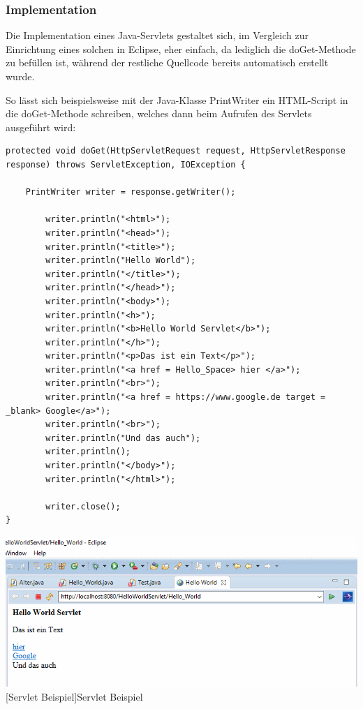 \documentclass[12pt,a4paper,bibliography=totocnumbered,listof=totocnumbered]{scrartcl}
\begin{document}
\subsubsection{Implementation}
Die Implementation eines Java-Servlets gestaltet sich, im Vergleich zur Einrichtung eines solchen in Eclipse, eher einfach, da lediglich die doGet-Methode zu befüllen ist, während der restliche Quellcode bereits automatisch erstellt wurde.

So lässt sich beispielsweise mit der Java-Klasse PrintWriter ein HTML-Script in die doGet-Methode schreiben, welches dann beim Aufrufen des Servlets ausgeführt wird:


\pagebreak
\vspace{1em}
\begin{lstlisting}[caption=Servlet Beispielcode, label=lst:servlet-html]
protected void doGet(HttpServletRequest request, HttpServletResponse response) throws ServletException, IOException {

	PrintWriter writer = response.getWriter();
	
		writer.println("<html>");
		writer.println("<head>");
		writer.println("<title>");
		writer.println("Hello World");
		writer.println("</title>");
		writer.println("</head>");
		writer.println("<body>");
		writer.println("<h>");
		writer.println("<b>Hello World Servlet</b>");
		writer.println("</h>");
		writer.println("<p>Das ist ein Text</p>");
		writer.println("<a href = Hello_Space> hier </a>");
		writer.println("<br>");
		writer.println("<a href = https://www.google.de target = _blank> Google</a>");
		writer.println("<br>");
		writer.println("Und das auch");
		writer.println();
		writer.println("</body>");
		writer.println("</html>");
		
		writer.close();		
}			
\end{lstlisting}


\vspace{1em}
\begin{minipage}{\linewidth}
	\centering
	\includegraphics[width=0.9\linewidth]{Bilder/Servlet-Beispiel.png}
	[Servlet Beispiel]{Servlet Beispiel}	
	\label{fig:eclipse6}
\end{minipage}
\\
\end{document}
